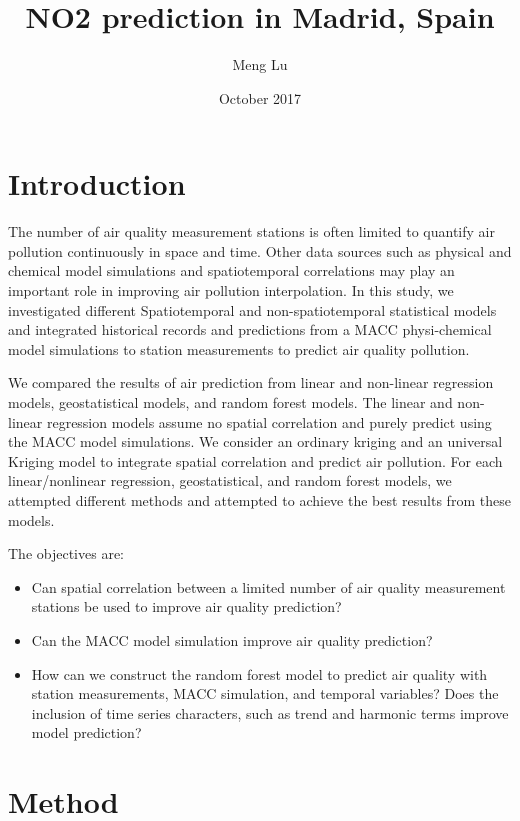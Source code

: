 \documentclass{article}
\title{NO2 prediction in Madrid, Spain}
\author{Meng Lu}
\date{October 2017}
\begin{document}
\maketitle

\section{Introduction}

The number of air quality measurement stations is often limited to quantify air pollution continuously in space and time. Other data sources such as physical and chemical model simulations and spatiotemporal correlations may play an important role in improving air pollution interpolation. In this study, we investigated different Spatiotemporal and non-spatiotemporal statistical models and integrated historical records and predictions from a MACC physi-chemical model simulations to station measurements to predict air quality pollution.

We compared the results of air prediction from linear and non-linear regression models, geostatistical models, and random forest models. The linear and non-linear regression models assume no spatial correlation and purely predict using the MACC model simulations. We consider an ordinary kriging and an universal Kriging model to integrate spatial correlation and predict air pollution. For each linear/nonlinear regression, geostatistical, and random forest models, we attempted different methods and attempted to achieve the best results from these models.    

The objectives are:
\begin{itemize}
\item Can spatial correlation between a limited number of air quality measurement stations be used to improve air quality prediction? 

\item Can the MACC model simulation improve air quality prediction?

\item How can we construct the random forest model to predict air quality with station measurements, MACC simulation, and temporal variables? Does the inclusion of time series characters, such as trend and harmonic terms improve model prediction? 

\end{itemize}

\section{Method}
\end{document}
